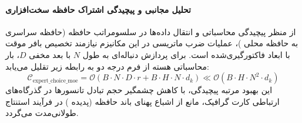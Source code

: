 \paragraph{تحلیل مجانبی و پیچیدگی اشتراک حافظه سخت‌افزاری}
از منظر پیچیدگی محاسباتی و انتقال داده‌ها در سلسومراتب حافظه (حافظه سراسری  به حافظه محلی )، عملیات ضرب ماتریسی در این مکانیزم نیازمند تخصیص بافر موقت با ابعاد فاکتورگیری‌شده است. برای پردازش دنباله‌ای به طول $N$ با بعد مخفی $D$، بار محاسباتی هسته از فرم درجه دو به رابطه زیر تقلیل می‌یابد:
\begin{equation}
\label{eq:complexity_expert_choice_moe}
\mathcal{C}_{\text{expert\_choice\_moe}} = \mathcal{O}\left( B \cdot N \cdot D \cdot r + B \cdot H \cdot N \cdot d_k \right) \ll \mathcal{O}\left( B \cdot H \cdot N^2 \cdot d_k \right)
\end{equation}
این بهبود مرتبه پیچیدگی، با کاهش چشمگیر حجم تبادل تانسورها در گذرگاه‌های ارتباطی کارت گرافیک، مانع از اشباع پهنای باند حافظه (پدیده ) در فرآیند استنتاج طولانی‌مدت می‌گردد.